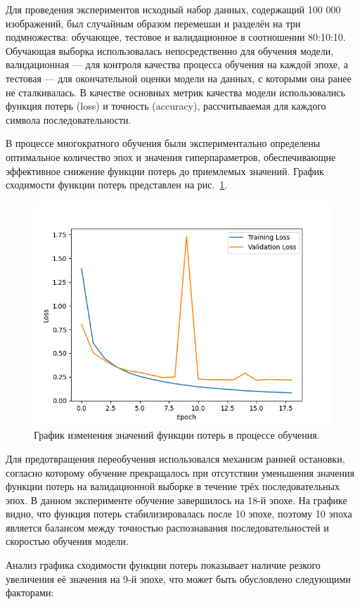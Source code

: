 Для проведения экспериментов исходный набор данных, содержащий 100 000 
изображений, был случайным образом перемешан и разделён на три подмножества: 
обучающее, тестовое и валидационное в соотношении 80:10:10. Обучающая выборка 
использовалась непосредственно для обучения модели, валидационная — для контроля 
качества процесса обучения на каждой эпохе, а тестовая — для окончательной 
оценки модели на данных, с которыми она ранее не сталкивалась. В качестве 
основных метрик качества модели использовались функция потерь (loss) и точность 
(accuracy), рассчитываемая для каждого символа последовательности.

В процессе многократного обучения были экспериментально определены оптимальное 
количество эпох и значения гиперпараметров, обеспечивающие эффективное снижение 
функции потерь до приемлемых значений. График сходимости функции потерь 
представлен на рис.~\ref{fig:loss}.

\begin{figure}[H]
    \centering
    \includegraphics[width=0.8\linewidth]{imgs/textcaptcha/Model_loss.png}
    \caption{График изменения значений функции потерь в процессе обучения.}
    \label{fig:loss}
\end{figure}

Для предотвращения переобучения использовался механизм ранней остановки, согласно 
которому обучение прекращалось при отсутствии уменьшения значения функции потерь 
на валидационной выборке в течение трёх последовательных эпох. В данном 
эксперименте обучение завершилось на 18-й эпохе. На графике видно, что функция 
потерь стабилизировалась после 10 эпохе, поэтому 10 эпоха является балансом между 
точностью распознавания последовательностей и скоростью обучения модели.

Анализ графика сходимости функции потерь показывает наличие резкого увеличения её 
значения на 9-й эпохе, что может быть обусловлено следующими факторами:

